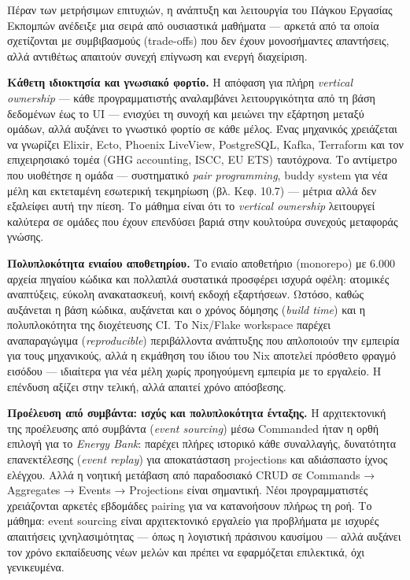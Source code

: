 \documentclass[11pt,a4paper,greek,twoside]{template-xe}
\begin{document}
Πέραν των μετρήσιμων επιτυχιών, η ανάπτυξη και λειτουργία του Πάγκου
Εργασίας Εκπομπών ανέδειξε μια σειρά από ουσιαστικά μαθήματα --- αρκετά
από τα οποία σχετίζονται με συμβιβασμούς (trade-offs) που δεν έχουν
μονοσήμαντες απαντήσεις, αλλά αντιθέτως απαιτούν συνεχή επίγνωση και
ενεργή διαχείριση.

\textbf{Κάθετη ιδιοκτησία και γνωσιακό φορτίο.} Η απόφαση για πλήρη
\emph{vertical ownership} --- κάθε προγραμματιστής αναλαμβάνει
λειτουργικότητα από τη βάση δεδομένων έως το UI --- ενισχύει τη συνοχή
και μειώνει την εξάρτηση μεταξύ ομάδων, αλλά αυξάνει το γνωστικό φορτίο
σε κάθε μέλος. Ένας μηχανικός χρειάζεται να γνωρίζει Elixir, Ecto,
Phoenix LiveView, PostgreSQL, Kafka, Terraform και τον επιχειρησιακό
τομέα (GHG accounting, ISCC, EU ETS) ταυτόχρονα. Το αντίμετρο που
υιοθέτησε η ομάδα --- συστηματικό \emph{pair programming}, buddy system
για νέα μέλη και εκτεταμένη εσωτερική τεκμηρίωση (βλ. Κεφ. 10.7) ---
μέτρια αλλά δεν εξαλείφει αυτή την πίεση. Το μάθημα είναι ότι το
\emph{vertical ownership} λειτουργεί καλύτερα σε ομάδες που έχουν
επενδύσει βαριά στην κουλτούρα συνεχούς μεταφοράς γνώσης.

\textbf{Πολυπλοκότητα ενιαίου αποθετηρίου.} Το ενιαίο αποθετήριο
(monorepo) με 6.000 αρχεία πηγαίου κώδικα και πολλαπλά συστατικά
προσφέρει ισχυρά οφέλη: ατομικές αναπτύξεις, εύκολη ανακατασκευή, κοινή
εκδοχή εξαρτήσεων. Ωστόσο, καθώς αυξάνεται η βάση κώδικα, αυξάνεται και
ο χρόνος δόμησης (\emph{build time}) και η πολυπλοκότητα της διοχέτευσης
CI. Το Nix/Flake workspace παρέχει αναπαραγώγιμα (\emph{reproducible})
περιβάλλοντα ανάπτυξης που απλοποιούν την εμπειρία για τους μηχανικούς,
αλλά η εκμάθηση του ίδιου του Nix αποτελεί πρόσθετο φραγμό εισόδου ---
ιδιαίτερα για νέα μέλη χωρίς προηγούμενη εμπειρία με το εργαλείο. Η
επένδυση αξίζει στην τελική, αλλά απαιτεί χρόνο απόσβεσης.

\textbf{Προέλευση από συμβάντα: ισχύς και πολυπλοκότητα ένταξης.} Η
αρχιτεκτονική της προέλευσης από συμβάντα (\emph{event sourcing}) μέσω
Commanded ήταν η ορθή επιλογή για το \emph{Energy Bank}: παρέχει πλήρες
ιστορικό κάθε συναλλαγής, δυνατότητα επανεκτέλεσης (\emph{event replay})
για αποκατάσταση projections και αδιάσπαστο ίχνος ελέγχου. Αλλά η
νοητική μετάβαση από παραδοσιακό CRUD σε Commands → Aggregates → Events
→ Projections είναι σημαντική. Νέοι προγραμματιστές χρειάζονται αρκετές
εβδομάδες pairing για να κατανοήσουν πλήρως τη ροή. Το μάθημα: event
sourcing είναι αρχιτεκτονικό εργαλείο για προβλήματα με ισχυρές
απαιτήσεις ιχνηλασιμότητας --- όπως η λογιστική πράσινου καυσίμου ---
αλλά αυξάνει τον χρόνο εκπαίδευσης νέων μελών και πρέπει να εφαρμόζεται
επιλεκτικά, όχι γενικευμένα.
\end{document}
